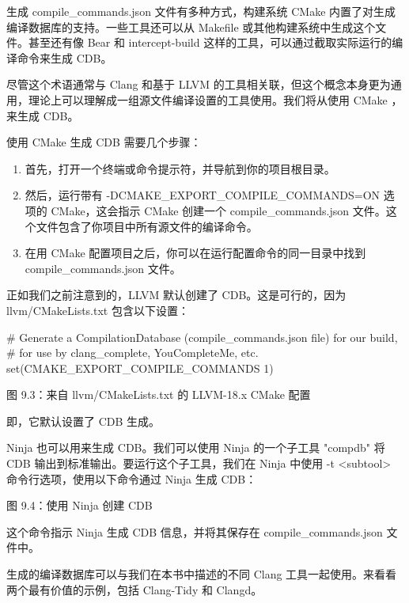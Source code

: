 生成 compile\_commands.json 文件有多种方式，构建系统 CMake 内置了对生成编译数据库的支持。一些工具还可以从 Makefile 或其他构建系统中生成这个文件。甚至还有像 Bear 和 intercept-build 这样的工具，可以通过截取实际运行的编译命令来生成 CDB。

尽管这个术语通常与 Clang 和基于 LLVM 的工具相关联，但这个概念本身更为通用，理论上可以理解成一组源文件编译设置的工具使用。我们将从使用 CMake ，来生成 CDB。


使用 CMake 生成 CDB 需要几个步骤：

\begin{enumerate}
\item
首先，打开一个终端或命令提示符，并导航到你的项目根目录。

\item
然后，运行带有 -DCMAKE\_EXPORT\_COMPILE\_COMMANDS=ON 选项的 CMake，这会指示 CMake 创建一个 compile\_commands.json 文件。这个文件包含了你项目中所有源文件的编译命令。

\item
在用 CMake 配置项目之后，你可以在运行配置命令的同一目录中找到 compile\_commands.json 文件。
\end{enumerate}

正如我们之前注意到的，LLVM 默认创建了 CDB。这是可行的，因为 llvm/CMakeLists.txt 包含以下设置：

\begin{cmake}
# Generate a CompilationDatabase (compile_commands.json file) for our build,
# for use by clang_complete, YouCompleteMe, etc.
set(CMAKE_EXPORT_COMPILE_COMMANDS 1)
\end{cmake}

\begin{center}
图 9.3：来自 llvm/CMakeLists.txt 的 LLVM-18.x CMake 配置
\end{center}

即，它默认设置了 CDB 生成。


Ninja 也可以用来生成 CDB。我们可以使用 Ninja 的一个子工具 "compdb" 将 CDB 输出到标准输出。要运行这个子工具，我们在 Ninja 中使用 -t <subtool> 命令行选项，使用以下命令通过 Ninja 生成 CDB：


\begin{center}
图 9.4：使用 Ninja 创建 CDB
\end{center}

这个命令指示 Ninja 生成 CDB 信息，并将其保存在 compile\_commands.json 文件中。

生成的编译数据库可以与我们在本书中描述的不同 Clang 工具一起使用。来看看两个最有价值的示例，包括 Clang-Tidy 和 Clangd。











